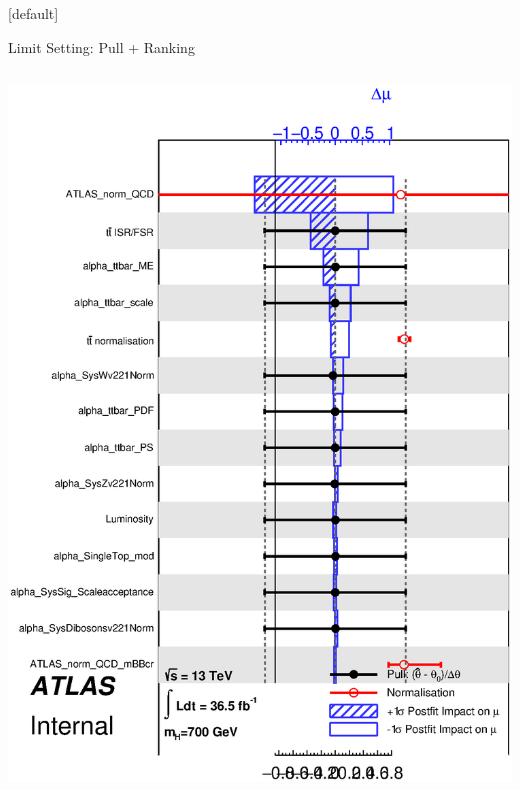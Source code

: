 \documentclass{beamer}
\begin{document}
{  \makeatletter %
  [default]
  \def\beamer@entrycode{\vspace*{-1.075\headheight}}
  \begin{frame}{Limit Setting: Pull + Ranking}
    \vspace{3pt}
    \begin{columns}
      \includegraphics[width=\textwidth]{../chapters/dihiggs2/figures/statFit/pullPlot_X700_mu0_unconditional.eps}

\end{columns}
\end{frame}}
\end{document}
